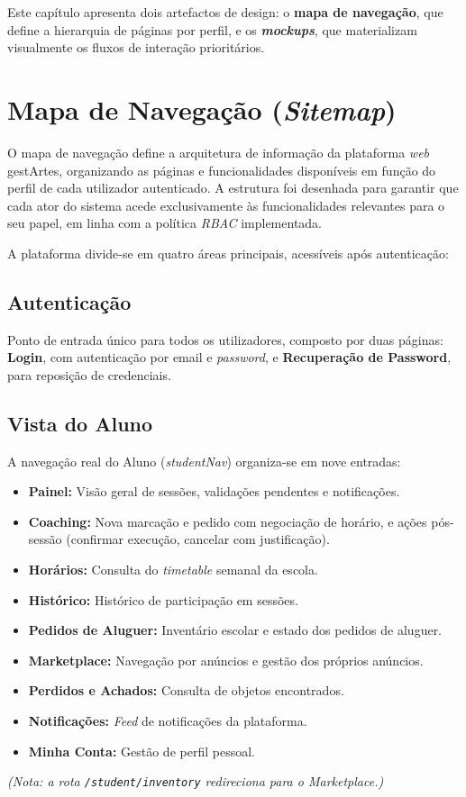 \documentclass[12pt,a4paper]{report}
\begin{document}
Este capítulo apresenta dois artefactos de design: o \textbf{mapa de navegação}, que define a hierarquia de páginas por perfil, e os \textbf{\textit{mockups}}, que materializam visualmente os fluxos de interação prioritários.

\section{Mapa de Navegação (\textit{Sitemap})}

O mapa de navegação define a arquitetura de informação da plataforma \textit{web} gestArtes, organizando as páginas e funcionalidades disponíveis em função do perfil de cada utilizador autenticado. A estrutura foi desenhada para garantir que cada ator do sistema acede exclusivamente às funcionalidades relevantes para o seu papel, em linha com a política \textit{RBAC} implementada.

A plataforma divide-se em quatro áreas principais, acessíveis após autenticação:

\subsection{Autenticação}
Ponto de entrada único para todos os utilizadores, composto por duas páginas: \textbf{Login}, com autenticação por email e \textit{password}, e \textbf{Recuperação de Password}, para reposição de credenciais.

\subsection{Vista do Aluno}
A navegação real do Aluno (\textit{studentNav}) organiza-se em nove entradas:
\begin{itemize}
    \item \textbf{Painel:} Visão geral de sessões, validações pendentes e notificações.
    \item \textbf{Coaching:} Nova marcação e pedido com negociação de horário, e ações pós-sessão (confirmar execução, cancelar com justificação).
    \item \textbf{Horários:} Consulta do \textit{timetable} semanal da escola.
    \item \textbf{Histórico:} Histórico de participação em sessões.
    \item \textbf{Pedidos de Aluguer:} Inventário escolar e estado dos pedidos de aluguer.
    \item \textbf{Marketplace:} Navegação por anúncios e gestão dos próprios anúncios.
    \item \textbf{Perdidos e Achados:} Consulta de objetos encontrados.
    \item \textbf{Notificações:} \textit{Feed} de notificações da plataforma.
    \item \textbf{Minha Conta:} Gestão de perfil pessoal.
\end{itemize}
\textit{(Nota: a rota \texttt{/student/inventory} redireciona para o Marketplace.)}
\end{document}
